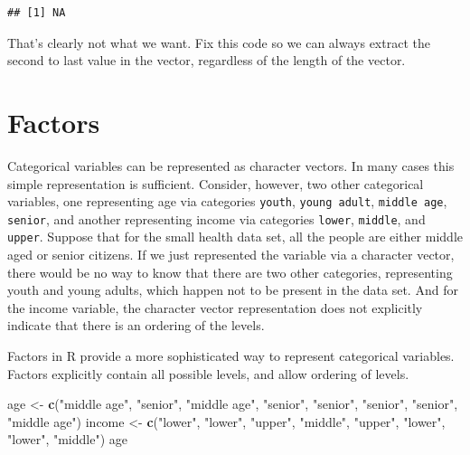 \documentclass[
]{krantz}
\newenvironment{Shaded}{\begin{snugshade}}{\end{snugshade}}
\newcommand{\KeywordTok}[1]{\textcolor[rgb]{0.13,0.29,0.53}{\textbf{#1}}}
\newcommand{\NormalTok}[1]{#1}
\newcommand{\StringTok}[1]{\textcolor[rgb]{0.31,0.60,0.02}{#1}}
\begin{document}
\begin{verbatim}
## [1] NA
\end{verbatim}

That's clearly not what we want. Fix this code so we can always extract the second to last value in the vector, regardless of the length of the vector.

\hypertarget{factors}{%
\section{Factors}\label{factors}}

Categorical variables can be represented as character vectors. In many cases this simple representation is sufficient. Consider, however, two other categorical variables, one representing age via categories \texttt{youth}, \texttt{young\ adult}, \texttt{middle\ age}, \texttt{senior}, and another representing income via categories \texttt{lower}, \texttt{middle}, and \texttt{upper}. Suppose that for the small health data set, all the people are either middle aged or senior citizens. If we just represented the variable via a character vector, there would be no way to know that there are two other categories, representing youth and young adults, which happen not to be present in the data set. And for the income variable, the character vector representation does not explicitly indicate that there is an ordering of the levels.

Factors in R provide a more sophisticated way to represent categorical variables. Factors explicitly contain all possible levels, and allow ordering of levels.

\begin{Shaded}
\begin{Highlighting}[]
\NormalTok{age \textless{}{-}}\StringTok{ }\KeywordTok{c}\NormalTok{(}\StringTok{"middle age"}\NormalTok{, }\StringTok{"senior"}\NormalTok{, }\StringTok{"middle age"}\NormalTok{, }\StringTok{"senior"}\NormalTok{,}
         \StringTok{"senior"}\NormalTok{, }\StringTok{"senior"}\NormalTok{, }\StringTok{"senior"}\NormalTok{, }\StringTok{"middle age"}\NormalTok{)}
\NormalTok{income \textless{}{-}}\StringTok{ }\KeywordTok{c}\NormalTok{(}\StringTok{"lower"}\NormalTok{, }\StringTok{"lower"}\NormalTok{, }\StringTok{"upper"}\NormalTok{, }\StringTok{"middle"}\NormalTok{, }\StringTok{"upper"}\NormalTok{,}
            \StringTok{"lower"}\NormalTok{, }\StringTok{"lower"}\NormalTok{, }\StringTok{"middle"}\NormalTok{)}
\NormalTok{age}
\end{Highlighting}
\end{Shaded}
\end{document}
